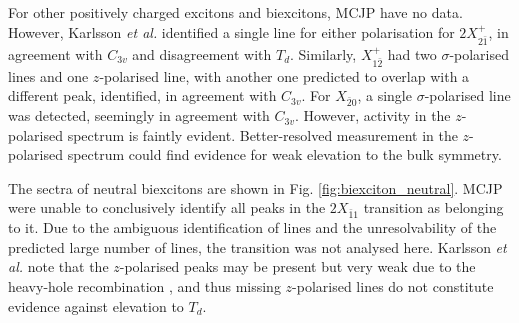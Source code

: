 \\\hfill\\

For other positively charged excitons and biexcitons, MCJP have no data. However, Karlsson \textit{et al.} identified a single line for either polarisation for $2X^+_{2\bar{1}}$, in agreement with $C_{3v}$ and disagreement with $T_d$. Similarly, $X^+_{1\bar{2}}$ had two $\sigma$-polarised lines and one $z$-polarised line, with another one predicted to overlap with a different peak, identified, in agreement with $C_{3v}$. For $X_{\bar{2}0}$, a single $\sigma$-polarised line was detected, seemingly in agreement with $C_{3v}$. However, activity in the $z$-polarised spectrum is faintly evident. Better-resolved measurement in the $z$-polarised spectrum could find evidence for weak elevation to the bulk symmetry.

The sectra of neutral biexcitons are shown in Fig. \ref{fig:biexciton_neutral}. MCJP were unable to conclusively identify all peaks in the $2X_{\bar{1}1}$ transition as belonging to it. Due to the ambiguous identification of lines and the unresolvability of the predicted large number of lines, the transition was not analysed here. Karlsson \textit{et al.} note that the $z$-polarised peaks may be present but very weak due to the heavy-hole recombination \cite[p. 16]{karlsson}, and thus missing $z$-polarised lines do not constitute evidence against elevation to $T_d$.

